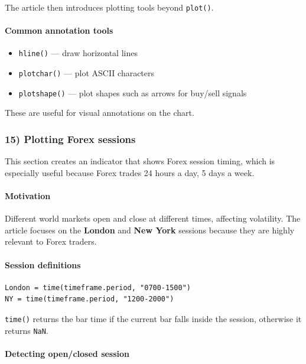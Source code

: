 \documentclass[12pt,openany]{book}
\begin{document}
The article then introduces plotting tools beyond \texttt{plot()}.

\paragraph{Common annotation tools}

\begin{itemize}[leftmargin=*]
    \item \texttt{hline()} --- draw horizontal lines
    \item \texttt{plotchar()} --- plot ASCII characters
    \item \texttt{plotshape()} --- plot shapes such as arrows for buy/sell signals
\end{itemize}

These are useful for visual annotations on the chart.

\subsubsection{15) Plotting Forex sessions}

This section creates an indicator that shows Forex session timing, which is especially useful because Forex trades 24 hours a day, 5 days a week.

\paragraph{Motivation}

Different world markets open and close at different times, affecting volatility. The article focuses on the \textbf{London} and \textbf{New York} sessions because they are highly relevant to Forex traders.

\paragraph{Session definitions}

\begin{Verbatim}[breaklines=true,breakanywhere=true,fontsize=\small]
London = time(timeframe.period, "0700-1500")
NY = time(timeframe.period, "1200-2000")
\end{Verbatim}

\texttt{time()} returns the bar time if the current bar falls inside the session, otherwise it returns \texttt{NaN}.

\paragraph{Detecting open/closed session}
\end{document}
